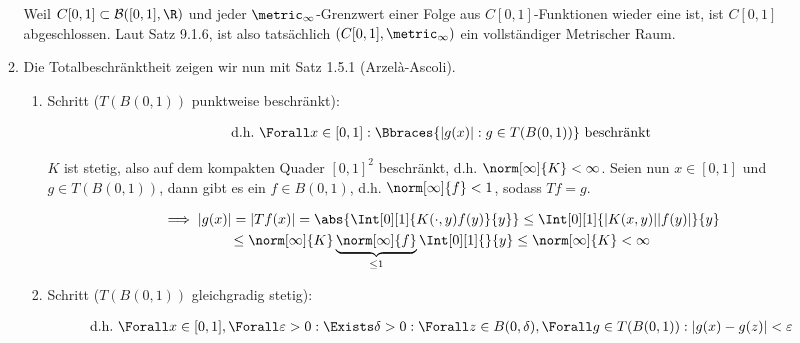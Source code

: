 \begin{solution}
\begin{enumerate}
\begin{enumerate}

        Weil $C[0, 1] \subset \mathcal{B}([0, 1], \R)$ und jeder $\metric_\infty$-Grenzwert einer Folge aus $C[0, 1]$-Funktionen wieder eine ist, ist $C[0, 1]$ abgeschlossen.
        Laut Satz 9.1.6, ist also tatsächlich $(C[0, 1], \metric_\infty)$ ein vollständiger Metrischer Raum.

        \item Die Totalbeschränktheit zeigen wir nun mit Satz 1.5.1 (Arzelà-Ascoli).


        \begin{enumerate}[label = \arabic*.]

            \item Schritt ($T(B(0, 1))$ punktweise beschränkt):
            
            \begin{align*}
                \text{d.h.}~
                \Forall x \in [0, 1]:
                \Bbraces{|g(x)|: g \in T(B(0, 1))} ~\text{beschränkt}
            \end{align*}

            $K$ ist stetig, also auf dem kompakten Quader $[0, 1]^2$ beschränkt, d.h. $\norm[\infty]{K} < \infty$.
            Seien nun $x \in [0, 1]$ und $g \in T(B(0, 1))$, dann gibt es ein $f \in B(0, 1)$, d.h. $\norm[\infty]{f} < 1$, sodass $Tf = g$.

            \begin{multline*}
                \implies
                |g(x)|
                =
                |Tf(x)|
                =
                \abs
                {
                    \Int[0][1]{K(\cdot, y) f(y)}{y}
                }
                \leq
                \Int[0][1]{|K(x, y)| |f(y)|}{y} \\
                \leq
                \norm[\infty]{K}
                \underbrace
                {
                    \norm[\infty]{f}
                }_{
                    \leq 1
                }
                \Int[0][1]{}{y}
                \leq
                \norm[\infty]{K}
                <
                \infty
            \end{multline*}

            \item Schritt ($T(B(0, 1))$ gleichgradig stetig):
            
            \begin{align*}
                \text{d.h.}~
                \Forall x \in [0, 1],
                \Forall \varepsilon > 0:
                \Exists \delta > 0:
                \Forall z \in B(0, \delta),
                \Forall g \in T(B(0, 1)):
                |g(x) - g(z)| < \varepsilon
            \end{align*}


\end{enumerate}
\end{enumerate}
\end{enumerate}
\end{solution}

